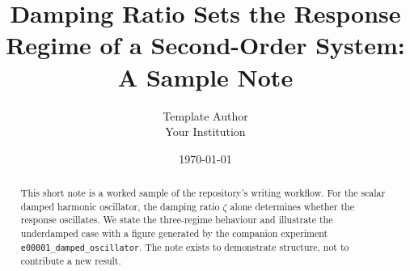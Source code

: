\documentclass[11pt]{article}
\title{Damping Ratio Sets the Response Regime of a Second-Order System:\\
       A Sample Note}
\author{Template Author\\{}Your Institution}
\date{\today}
\begin{document}
\maketitle

\begin{abstract}
This short note is a worked sample of the repository's writing workflow. For the
scalar damped harmonic oscillator, the damping ratio $\zeta$ alone determines
whether the response oscillates. We state the three-regime behaviour and
illustrate the underdamped case with a figure generated by the companion
experiment \texttt{e00001\_damped\_oscillator}. The note exists to demonstrate
structure, not to contribute a new result.
\end{abstract}





\end{document}
